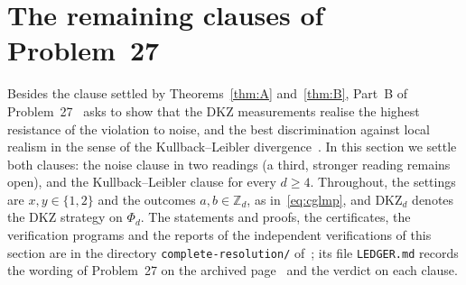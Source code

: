 \documentclass[11pt]{amsart}
\theoremstyle{definition}
\theoremstyle{remark}
\numberwithin{equation}{section}
\newcommand{\Z}{\mathbb{Z}}
\newcommand{\DKZ}{\mathrm{DKZ}}
\begin{document}
\section{The remaining clauses of Problem~27}\label{sec:clauses}

Besides the clause settled by Theorems~\ref{thm:A} and~\ref{thm:B}, Part~B of Problem~27~\cite{OQP} asks to show that
the DKZ measurements realise the highest resistance of the violation to noise, and the best discrimination against
local realism in the sense of the Kullback--Leibler divergence~\cite{vDGG}. In this section we settle both clauses: the
noise clause in two readings (a third, stronger reading remains open), and the Kullback--Leibler clause for every
$d\ge4$. Throughout, the settings are $x,y\in\{1,2\}$ and the outcomes $a,b\in\Z_d$, as in~\eqref{eq:cglmp}, and
$\DKZ_d$ denotes the DKZ strategy on $\Phi_d$. The statements and proofs, the certificates, the verification programs
and the reports of the independent verifications of this section are in the directory \texttt{complete-resolution/}
of~\cite{repo-oqp27}; its file \texttt{LEDGER.md} records the wording of Problem~27 on the archived page~\cite{OQP} and
the verdict on each clause.
\end{document}
